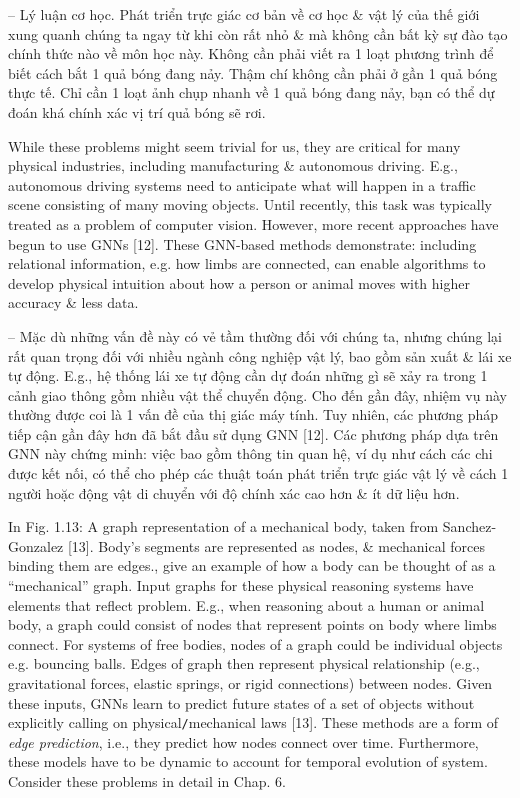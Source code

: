 \documentclass{article}
\begin{document}
\begin{itemize}
\begin{itemize}
\begin{itemize}
            -- {\sf Lý luận cơ học.} Phát triển trực giác cơ bản về cơ học \& vật lý của thế giới xung quanh chúng ta ngay từ khi còn rất nhỏ \& mà không cần bất kỳ sự đào tạo chính thức nào về môn học này. Không cần phải viết ra 1 loạt phương trình để biết cách bắt 1 quả bóng đang nảy. Thậm chí không cần phải ở gần 1 quả bóng thực tế. Chỉ cần 1 loạt ảnh chụp nhanh về 1 quả bóng đang nảy, bạn có thể dự đoán khá chính xác vị trí quả bóng sẽ rơi.

            While these problems might seem trivial for us, they are critical for many physical industries, including manufacturing \& autonomous driving. E.g., autonomous driving systems need to anticipate what will happen in a traffic scene consisting of many moving objects. Until recently, this task was typically treated as a problem of computer vision. However, more recent approaches have begun to use GNNs [12]. These GNN-based methods demonstrate: including relational information, e.g. how limbs are connected, can enable algorithms to develop physical intuition about how a person or animal moves with higher accuracy \& less data.

            -- Mặc dù những vấn đề này có vẻ tầm thường đối với chúng ta, nhưng chúng lại rất quan trọng đối với nhiều ngành công nghiệp vật lý, bao gồm sản xuất \& lái xe tự động. E.g., hệ thống lái xe tự động cần dự đoán những gì sẽ xảy ra trong 1 cảnh giao thông gồm nhiều vật thể chuyển động. Cho đến gần đây, nhiệm vụ này thường được coi là 1 vấn đề của thị giác máy tính. Tuy nhiên, các phương pháp tiếp cận gần đây hơn đã bắt đầu sử dụng GNN [12]. Các phương pháp dựa trên GNN này chứng minh: việc bao gồm thông tin quan hệ, ví dụ như cách các chi được kết nối, có thể cho phép các thuật toán phát triển trực giác vật lý về cách 1 người hoặc động vật di chuyển với độ chính xác cao hơn \& ít dữ liệu hơn.

            In {\sf Fig. 1.13: A graph representation of a mechanical body, taken from Sanchez-Gonzalez [13]. Body's segments are represented as nodes, \& mechanical forces binding them are edges.}, give an example of how a body can be thought of as a ``mechanical'' graph. Input graphs for these physical reasoning systems have elements that reflect problem. E.g., when reasoning about a human or animal body, a graph could consist of nodes that represent points on body where limbs connect. For systems of free bodies, nodes of a graph could be individual objects e.g. bouncing balls. Edges of graph then represent physical relationship (e.g., gravitational forces, elastic springs, or rigid connections) between nodes. Given these inputs, GNNs learn to predict future states of a set of objects without explicitly calling on physical{\tt/}mechanical laws [13]. These methods are a form of {\it edge prediction}, i.e., they predict how nodes connect over time. Furthermore, these models have to be dynamic to account for temporal evolution of system. Consider these problems in detail in Chap. 6.


\end{itemize}
\end{itemize}
\end{itemize}
\end{document}
